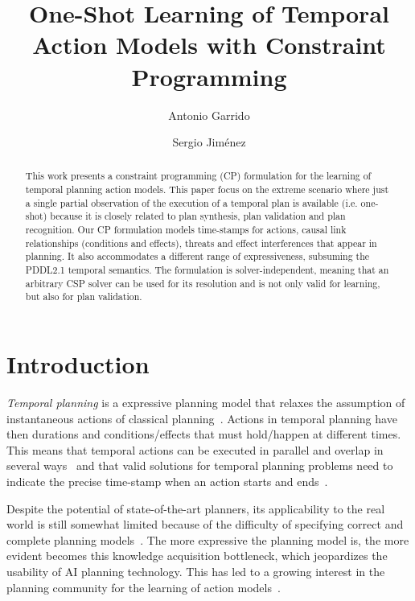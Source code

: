 \documentclass{ecai}
\begin{document}
\title{One-Shot Learning of Temporal Action Models with Constraint Programming}
\author{Antonio Garrido \and Sergio Jim\'enez}
 
\maketitle

\begin{abstract}
  This work presents a constraint programming (CP) formulation for the learning of temporal planning action models. This paper focus on the extreme scenario where just a single partial observation of the execution of a temporal plan is available (i.e. one-shot) because it is closely related to plan synthesis, plan validation and plan recognition. Our CP formulation models time-stamps for actions, causal link relationships (conditions and effects), threats and effect interferences that appear in planning. It also accommodates a different range of expressiveness, subsuming the PDDL2.1 temporal semantics. The formulation is solver-independent, meaning that an arbitrary CSP solver can be used for its resolution and is not only valid for learning, but also for plan validation. 
\end{abstract}


\section{Introduction}
{\em Temporal planning} is a expressive planning model that relaxes the assumption of instantaneous actions of classical planning~\cite{fox2003pddl2}. Actions in temporal planning have then durations and conditions/effects that must hold/happen at different times. This means that temporal actions can be executed in parallel and overlap in several ways~\cite{cushing2007temporal} and that valid solutions for temporal planning problems need to indicate the precise time-stamp when an action starts and ends~\cite{howey2004val}.

Despite the potential of state-of-the-art planners, its applicability to the real world is still somewhat limited because of the difficulty of specifying correct and complete planning models~\cite{kambhampati2007model}. The more expressive the planning model is, the more evident becomes this knowledge acquisition bottleneck, which jeopardizes the usability of AI planning technology. This has led to a growing interest in the planning community for the learning of action models~\cite{jimenez2012review}.
\end{document}
